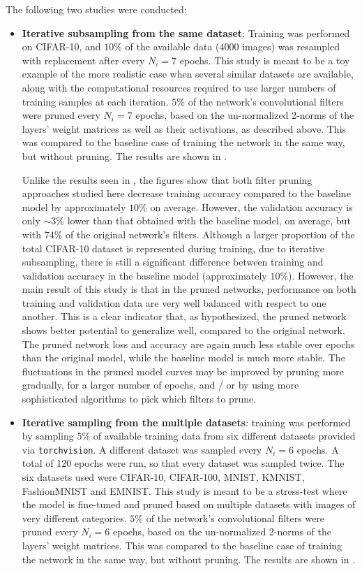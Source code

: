 \documentclass{article}
\begin{document}
The following two studies were conducted:
\begin{itemize}
	\item \textbf{Iterative subsampling from the same dataset}: Training was performed on CIFAR-10, and $10$\% of the available data ($4000$ images) was resampled with replacement after every $N_i = 7$ epochs.
	This study is meant to be a toy example of the more realistic case when several similar datasets are available, along with the computational resources required to use larger numbers of training samples at each iteration.
	$5$\% of the network's convolutional filters were pruned every $N_i = 7$ epochs, based on the un-normalized 2-norms of the layers' weight matrices as well as their activations, as described above. This was compared to the baseline case of training the network in the same way, but without pruning. The results are shown in .
	
	Unlike the results seen in , the figures show that both filter pruning approaches studied here decrease training accuracy compared to the baseline model by approximately $10$\% on average. However, the validation accuracy is only $\sim 3$\% lower than that obtained with the baseline model, on average, but with $74$\% of the original network's filters. Although a larger proportion of the total CIFAR-10 dataset is represented during training, due to iterative subsampling, there is still a significant difference between training and validation accuracy in the baseline model (approximately $10$\%). However, the main result of this study is that in the pruned networks, performance on both training and validation data are very well balanced with respect to one another. This is a clear indicator that, as hypothesized, the pruned network shows better potential to generalize well, compared to the original network. The pruned network loss and accuracy are again much less stable over epochs than the original model, while the baseline model is much more stable. The fluctuations in the pruned model curves may be improved by pruning more gradually, for a larger number of epochs, and / or by using more sophisticated algorithms to pick which filters to prune.
	
	\item \textbf{Iterative sampling from the multiple datasets}: training was performed by sampling $5$\% of available training data from six different datasets provided via \texttt{torchvision}.
	A different dataset was sampled every $N_i = 6$ epochs.
	A total of 120 epochs were run, so that every dataset was sampled twice.
	The six datasets used were CIFAR-10, CIFAR-100, MNIST, KMNIST, FashionMNIST and EMNIST.
	This study is meant to be a stress-test where the model is fine-tuned and pruned based on multiple datasets with images of very different categories. $5$\% of the network's convolutional filters were pruned every $N_i = 6$ epochs, based on the un-normalized 2-norms of the layers' weight matrices. This was compared to the baseline case of training the network in the same way, but without pruning. The results are shown in .
	

\end{itemize}
\end{document}
